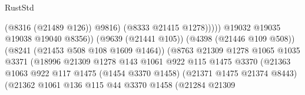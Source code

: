 \begin{lexlean}{RustStd}
\begin{coremodule}
                                                              (@8316 (@21489 @126))
                                                              @9816)
                                                            (@8333 @21415 @1278)))))
                                                    @19032
                                                    @19035
                                                    @19038
                                                    @19040
                                                    @8356))
                                                (@9639 (@21441 @105))
                                                (@4398 (@21446 @109 @508))
                                                (@8241 (@21453 @508 @108 @1609 @1464))
                                                (@8763
                                                  @21309
                                                  @1278
                                                  @1065
                                                  @1035
                                                  @3371
                                                  (@18996
                                                    @21309
                                                    @1278
                                                    @143
                                                    @1061
                                                    @922
                                                    @115
                                                    @1475
                                                    @3370
                                                    (@21363
                                                      @1063
                                                      @922
                                                      @117
                                                      @1475
                                                      (@1454 @3370 @1458)
                                                      (@21371 @1475 @21374 @8443)
                                                      (@21362
                                                        @1061
                                                        @136
                                                        @115
                                                        @44
                                                        @3370
                                                        @1458
                                                        (@21284
                                                          @21309

\end{coremodule}
\end{lexlean}
